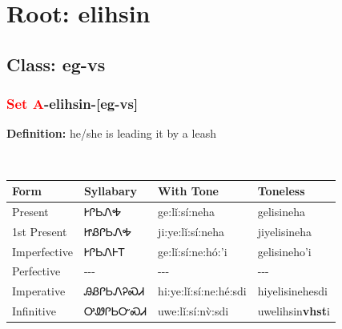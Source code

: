 \needspace{4in}
\section*{Root: elihsin}
\nopagebreak
{}
\needspace{3in}
\subsection*{Class: eg-vs}
\nopagebreak
\needspace{2in}
\subsubsection*{\textcolor{Red}{Set A}{-}\textbf{elihsin}{-}[eg-vs]}
\nopagebreak
\textbf{Definition: } he/she is leading it by a leash
\\[0.5em]
\begin{tabularx}{\textwidth}{l X X X}%
\toprule%
\textbf{Form}&\textbf{Syllabary}&\textbf{With Tone}&\textbf{Toneless}\\%
\midrule%
Present&ᎨᎵᏏᏁᎭ&ge:lǐ:sí:neha&gelisineha\\%
1st Present&ᏥᏰᎵᏏᏁᎭ&ji:ye:lǐ:sí:neha&jiyelisineha\\%
Imperfective&ᎨᎵᏏᏁᎰᎢ&ge:lǐ:sí:ne:hó:’i&gelisineho{\textquoteright}i\\%
Perfective&{-}{-}{-}&{-}{-}{-}&{-}{-}{-}\\%
Imperative&ᎯᏰᎵᏏᏁᎮᏍᏗ&hi:ye:lǐ:sí:ne:hé:sdi&hiyelisinehesdi\\%
Infinitive&ᎤᏪᎵᏏᏅᏍᏗ&uwe:lǐ:sí:nv̀:sdi&uwelihsin\textbf{vhst}i\\%
\bottomrule%
\end{tabularx}
\\[1em]